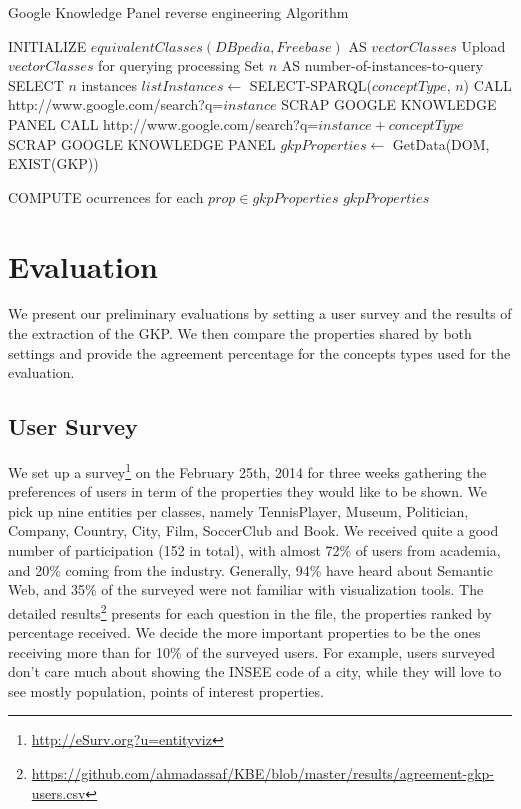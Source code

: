 \documentclass[runningheads,a4paper]{llncs}
\begin{document}
\begin{algorithm}[h]
\caption{Google Knowledge Panel reverse engineering Algorithm} \label{algoscrapping}
\begin{algorithmic}[1]
    \STATE INITIALIZE $equivalentClasses(DBpedia,Freebase) $ AS $vectorClasses$
    \STATE Upload $vectorClasses$ for querying processing
    \STATE Set $n$ AS number-of-instances-to-query
	\STATE SELECT $n$ instances
	\STATE $listInstances \leftarrow$ SELECT-SPARQL($conceptType$, $n$)
			\STATE CALL http://www.google.com/search?q=$instance$
				\STATE SCRAP GOOGLE KNOWLEDGE PANEL
			\ELSE
				\STATE CALL http://www.google.com/search?q=$instance + conceptType$
 				\STATE SCRAP GOOGLE KNOWLEDGE PANEL
			\ENDIF
			\STATE $gkpProperties \leftarrow$ GetData(DOM, EXIST(GKP))
			
		\ENDFOR
	\STATE COMPUTE ocurrences for each $prop \in gkpProperties$
    \ENDFOR
    \RETURN $gkpProperties$
\end{algorithmic}
\end{algorithm}


\section{Evaluation}
\label{sec:evaluation}
We present our preliminary evaluations by setting a user survey and the results of the extraction of the GKP. We then compare the properties shared by both settings and provide the agreement percentage for the concepts types used for the evaluation.

\subsection{User Survey}
\label{sec:survey}
We set up a survey\footnote{\url{http://eSurv.org?u=entityviz}} on the February 25th, 2014 for three weeks gathering the preferences of users in term of the properties they would like to be shown. We pick up nine entities per classes, namely \textsf{TennisPlayer}, \textsf{Museum}, \textsf{Politician}, \textsf{Company}, \textsf{Country}, \textsf{City}, \textsf{Film}, \textsf{SoccerClub} and \textsf{Book}.
We received quite a good number of participation (152 in total), with almost 72\% of users from academia, and 20\% coming from the industry. Generally, 94\% have heard about Semantic Web, and 35\% of the surveyed were not familiar with visualization tools. The detailed results\footnote{\url{https://github.com/ahmadassaf/KBE/blob/master/results/agreement-gkp-users.csv}} presents for each question in the file, the properties ranked by percentage received. We decide the more important properties to be the ones receiving more than for 10\% of the surveyed users.
 For example, users surveyed don't care much about showing the \textsf{INSEE code} of a city, while they will love to see mostly \textsf{population}, \textsf{points of interest} properties.
\end{document}
